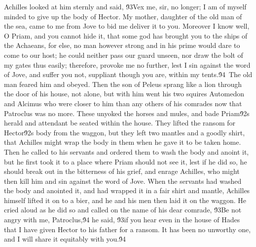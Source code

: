 {Achilles looked at him sternly and said, \'93Vex me, sir, no longer; I am of myself minded to give up the body of Hector. My mother, daughter of the old man of the sea, came to me from Jove to bid me deliver it to you. Moreover I know well, O Priam, and you cannot hide it, that some god has brought you to the ships of the Achaeans, for else, no man however strong and in his prime would dare to come to our host; he could neither pass our guard unseen, nor draw the bolt of my gates thus easily; therefore, provoke me no further, lest I sin against the word of Jove, and suffer you not, suppliant though you are, within my tents.\'94\
The old man feared him and obeyed. Then the son of Peleus sprang like a lion through the door of his house, not alone, but with him went his two squires Automedon and Alcimus who were closer to him than any others of his comrades now that Patroclus was no more. These unyoked the horses and mules, and bade Priam\'92s herald and attendant be seated within the house. They lifted the ransom for Hector\'92s body from the waggon, but they left two mantles and a goodly shirt, that Achilles might wrap the body in them when he gave it to be taken home. Then he called to his servants and ordered them to wash the body and anoint it, but he first took it to a place where Priam should not see it, lest if he did so, he should break out in the bitterness of his grief, and enrage Achilles, who might then kill him and sin against the word of Jove. When the servants had washed the body and anointed it, and had wrapped it in a fair shirt and mantle, Achilles himself lifted it on to a bier, and he and his men then laid it on the waggon. He cried aloud as he did so and called on the name of his dear comrade, \'93Be not angry with me, Patroclus,\'94 he said, \'93if you hear even in the house of Hades that I have given Hector to his father for a ransom. It has been no unworthy one, and I will share it equitably with you.\'94\
}
